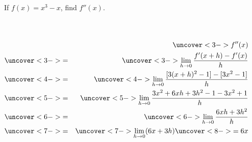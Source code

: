 \begin{frame}
\begin{example}[Example 6, p. 130]
If $f(x) = x^3-x$, find $f''(x)$.
\begin{columns}[c]
\ %
%
%
%
\abovedisplayskip=0pt
\belowdisplayskip=0pt
\begin{eqnarray*}
& & \uncover<3->{f''(x)}\\%
 & \uncover<3->{ = } & %
\uncover<3->{\lim_{h\rightarrow 0}\frac{f'(x+h)-f'(x)}{h}}\\%
 & \uncover<4->{ = } & %
\uncover<4->{\lim_{h\rightarrow 0}\frac{[3(x+h)^2-1]-[3x^2-1]}{h}}\\%
 & \uncover<5->{ = } & %
\uncover<5->{\lim_{h\rightarrow 0}\frac{3x^2 + 6xh + 3h^2 -1 - 3x^2 +1}{h}}\\%
 & \uncover<6->{ = } & %
\uncover<6->{\lim_{h\rightarrow 0}\frac{6xh + 3h^2}{h}}\\%
 & \uncover<7->{ = } & %
\uncover<7->{\lim_{h\rightarrow 0}(6x + 3h)}\uncover<8->{ = 6x}\\%
\end{eqnarray*}
\end{columns}
\end{example}
\end{frame}
